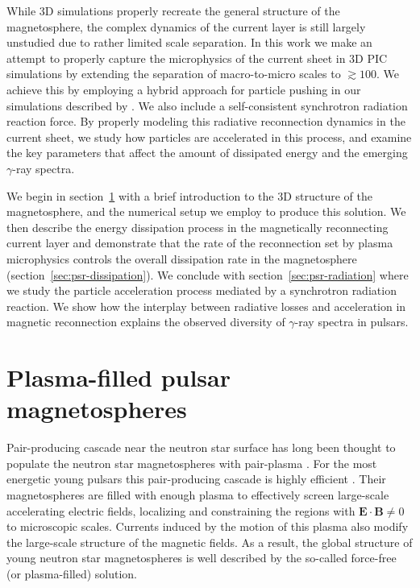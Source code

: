While 3D simulations properly recreate the general structure of the magnetosphere, the complex dynamics of the current layer is still largely unstudied due to rather limited scale separation. In this work we make an attempt to properly capture the microphysics of the current sheet in 3D PIC simulations by extending the separation of macro-to-micro scales to $\gtrsim 100$. We achieve this by employing a hybrid approach for particle pushing in our simulations described by \cite{2020ApJS..251...10B}. We also include a self-consistent synchrotron radiation reaction force. By properly modeling this radiative reconnection dynamics in the current sheet, we study how particles are accelerated in this process, and examine the key parameters that affect the amount of dissipated energy and the emerging $\gamma$-ray spectra.

We begin in section~\ref{sec:psr-magnetosphere} with a brief introduction to the 3D structure of the magnetosphere, and the numerical setup we employ to produce this solution. We then describe the energy dissipation process in the magnetically reconnecting current layer and demonstrate that the rate of the reconnection set by plasma microphysics controls the overall dissipation rate in the magnetosphere (section~\ref{sec:psr-dissipation}). We conclude with section~\ref{sec:psr-radiation} where we study the particle acceleration process mediated by a synchrotron radiation reaction. We show how the interplay between radiative losses and acceleration in magnetic reconnection explains the observed diversity of $\gamma$-ray spectra in pulsars. 

\section{Plasma-filled pulsar magnetospheres} 
\label{sec:psr-magnetosphere}
Pair-producing cascade near the neutron star surface has long been thought to populate the neutron star magnetospheres with pair-plasma \citep{1971ApJ...164..529S,1975ApJ...196...51R}. For the most energetic young pulsars this pair-producing cascade is highly efficient \citep{2015ApJ...810..144T, 2019ApJ...871...12T}. Their magnetospheres are filled with enough plasma to effectively screen large-scale accelerating electric fields, localizing and constraining the regions with $\bm{E}\cdot\bm{B} \ne 0$ to microscopic scales. Currents induced by the motion of this plasma also modify the large-scale structure of the magnetic fields. As a result, the global structure of young neutron star magnetospheres is well described by the so-called force-free (or plasma-filled) solution.

